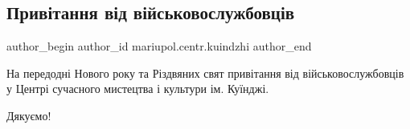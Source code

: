  
 
 
 
 

\subsection{Привітання від військовослужбовців}
\label{sec:27_12_2019.fb.mariupol.centr.kuindzhi.3.pryvitannja_vijskovosluzhbovci}

\ifcmt
 author_begin
   author_id mariupol.centr.kuindzhi
 author_end
\fi

На передодні Нового року та Різдвяних свят привітання від військовослужбовців у
Центрі сучасного мистецтва і культури ім. Куїнджі.

Дякуємо!
